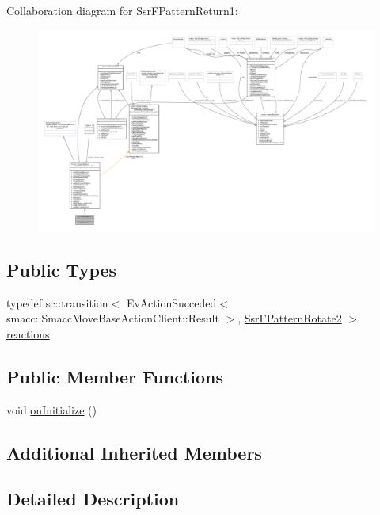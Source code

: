 Collaboration diagram for Ssr\+F\+Pattern\+Return1\+:
\nopagebreak
\begin{figure}[H]
\begin{center}
\leavevmode
\includegraphics[width=350pt]{structSsrFPatternReturn1__coll__graph}
\end{center}
\end{figure}
\subsection*{Public Types}
\begin{DoxyCompactItemize}
\item 
typedef sc\+::transition$<$ Ev\+Action\+Succeded$<$ smacc\+::\+Smacc\+Move\+Base\+Action\+Client\+::\+Result $>$, \hyperlink{structSsrFPatternRotate2}{Ssr\+F\+Pattern\+Rotate2} $>$ \hyperlink{structSsrFPatternReturn1_adf53d61ea903824985e33f4dd2527cea}{reactions}
\end{DoxyCompactItemize}
\subsection*{Public Member Functions}
\begin{DoxyCompactItemize}
\item 
void \hyperlink{structSsrFPatternReturn1_acce01589edd211023478e946a070851a}{on\+Initialize} ()
\end{DoxyCompactItemize}
\subsection*{Additional Inherited Members}


\subsection{Detailed Description}


